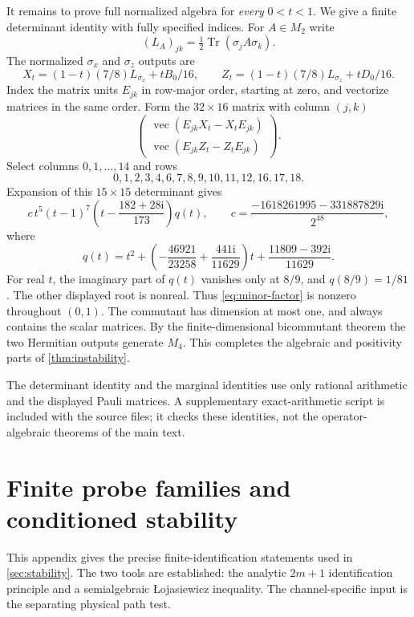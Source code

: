 \documentclass[11pt,reqno]{amsart}
\theoremstyle{definition}
\theoremstyle{remark}
\numberwithin{equation}{section}
\DeclareMathOperator{\Tr}{Tr}
\newcommand{\ii}{\mathrm i}
\begin{document}
It remains to prove full normalized algebra for \emph{every} $0<t<1$. We give a finite determinant identity with fully specified indices. For $A\in M_2$ write
\[
 (L_A)_{jk}=\tfrac12\Tr(\sigma_jA\sigma_k).
\]
The normalized $\sigma_x$ and $\sigma_z$ outputs are
\[
 X_t=(1-t)(7/8)L_{\sigma_x}+tB_0/16,\qquad
 Z_t=(1-t)(7/8)L_{\sigma_z}+tD_0/16.
\]
Index the matrix units $E_{jk}$ in row-major order, starting at zero, and vectorize matrices in the same order. Form the $32\times16$ matrix with column $(j,k)$
\[
 \begin{pmatrix}\operatorname{vec}(E_{jk}X_t-X_tE_{jk})\\
 \operatorname{vec}(E_{jk}Z_t-Z_tE_{jk})\end{pmatrix}.
\]
Select columns $0,1,\ldots,14$ and rows
\[
 0,1,2,3,4,6,7,8,9,10,11,12,16,17,18.
\]
Expansion of this $15\times15$ determinant gives
\begin{equation}\label{eq:minor-factor}
 c\,t^5(t-1)^7\left(t-\frac{182+28\ii}{173}\right)q(t),
 \qquad c=\frac{-1618261995-331887829\ii}{2^{48}},
\end{equation}
where
\[
 q(t)=t^2+\left(-\frac{46921}{23258}+\frac{441\ii}{11629}\right)t
                  +\frac{11809-392\ii}{11629}.
\]
For real $t$, the imaginary part of $q(t)$ vanishes only at $8/9$, and $q(8/9)=1/81$. The other displayed root is nonreal. Thus \eqref{eq:minor-factor} is nonzero throughout $(0,1)$. The commutant has dimension at most one, and always contains the scalar matrices. By the finite-dimensional bicommutant theorem the two Hermitian outputs generate $M_4$. This completes the algebraic and positivity parts of \cref{thm:instability}.

The determinant identity and the marginal identities use only rational arithmetic and the displayed Pauli matrices. A supplementary exact-arithmetic script is included with the source files; it checks these identities, not the operator-algebraic theorems of the main text.



\section{Finite probe families and conditioned stability}\label{app:probes}

This appendix gives the precise finite-identification statements used in \cref{sec:stability}. The two tools are established: the analytic $2m+1$ identification principle and a semialgebraic \L ojasiewicz inequality. The channel-specific input is the separating physical path test.
\end{document}

